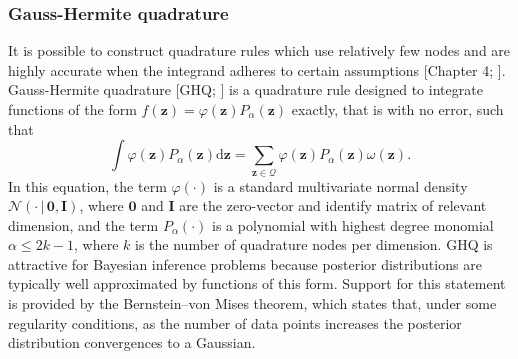 \documentclass[a4paper, nobind]{templates/ociamthesis}
\begin{document}
\hypertarget{gauss-hermite-quadrature}{%
\subsubsection{Gauss-Hermite quadrature}\label{gauss-hermite-quadrature}}

It is possible to construct quadrature rules which use relatively few nodes and are highly accurate when the integrand adheres to certain assumptions {[}Chapter 4; \textcite{press2007numerical}{]}.
Gauss-Hermite quadrature {[}GHQ; \textcite{davis1975methods}{]} is a quadrature rule designed to integrate functions of the form \(f(\mathbf{z}) = \varphi(\mathbf{z}) P_\alpha(\mathbf{z})\) exactly, that is with no error, such that
\begin{equation}
\int \varphi(\mathbf{z}) P_\alpha(\mathbf{z}) \text{d} \mathbf{z} = \sum_{\mathbf{z} \in \mathcal{Q}}  \varphi(\mathbf{z}) P_\alpha(\mathbf{z}) \omega(\mathbf{z}). \label{eq:ghqexact}
\end{equation}
In this equation, the term \(\varphi(\cdot)\) is a standard multivariate normal density \(\mathcal{N}(\cdot \, | \, \mathbf{0}, \mathbf{I})\), where \(\mathbf{0}\) and \(\mathbf{I}\) are the zero-vector and identify matrix of relevant dimension, and the term \(P_\alpha(\cdot)\) is a polynomial with highest degree monomial \(\alpha \leq 2k - 1\), where \(k\) is the number of quadrature nodes per dimension.
GHQ is attractive for Bayesian inference problems because posterior distributions are typically well approximated by functions of this form.
Support for this statement is provided by the Bernstein--von Mises theorem, which states that, under some regularity conditions, as the number of data points increases the posterior distribution convergences to a Gaussian.
\end{document}
